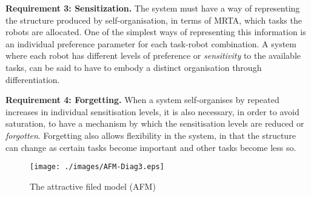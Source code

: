 \documentclass{intech}
\begin{document}
\textbf{Requirement 3: Sensitization.} The system must have a way of representing the structure produced by self-organisation, in terms of MRTA, which tasks the robots are allocated.  One of the simplest ways of representing this information is an individual preference parameter for each task-robot combination.  A system where each robot has different levels of preference or {\em sensitivity} to the available tasks, can be said to have to embody a distinct organisation through differentiation.

\textbf{Requirement 4: Forgetting.} When a system self-organises by repeated increases in individual sensitisation levels, it is also necessary, in order to avoid saturation, to have a mechanism by which the sensitisation levels are reduced or {\em forgotten}.  Forgetting also allows flexibility in the system, in that the structure can change as certain tasks become important and other tasks become less so. %
\begin{figure}
\centering
\texttt{[image: ./images/AFM-Diag3.eps]}
\caption{The attractive filed model (AFM)}
\label{fig:afm} %
\end{figure}
\end{document}
